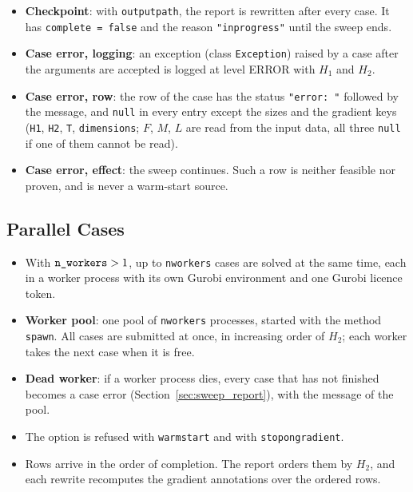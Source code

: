 \documentclass[11pt,a4paper]{article}
\theoremstyle{plain}
\theoremstyle{definition}
\renewcommand{\_}{\textunderscore\allowbreak{}}
\begin{document}
\begin{itemize}[nosep,leftmargin=1.5em]
  \item \textbf{Checkpoint}: with \texttt{output\_path}, the report is rewritten after every case. It has \texttt{complete = false} and the reason \texttt{"in\_progress"} until the sweep ends.
  \item \textbf{Case error, logging}: an exception (class \texttt{Exception}) raised by a case after the arguments are accepted is logged at level ERROR with $H_1$ and $H_2$.
  \item \textbf{Case error, row}: the row of the case has the status \texttt{"error: "} followed by the message, and \texttt{null} in every entry except the sizes and the gradient keys (\texttt{H1}, \texttt{H2}, \texttt{T}, \texttt{dimensions}; $F$, $M$, $L$ are read from the input data, all three \texttt{null} if one of them cannot be read).
  \item \textbf{Case error, effect}: the sweep continues. Such a row is neither feasible nor proven, and is never a warm-start source.
\end{itemize}

\subsection{Parallel Cases}
\label{sec:sweep_parallel}

\begin{itemize}[nosep,leftmargin=1.5em]
  \item With $\texttt{n\_workers} > 1$, up to \texttt{n\_workers} cases are solved at the same time, each in a worker process with its own Gurobi environment and one Gurobi licence token.
  \item \textbf{Worker pool}: one pool of \texttt{n\_workers} processes, started with the method \texttt{spawn}. All cases are submitted at once, in increasing order of $H_2$; each worker takes the next case when it is free.
  \item \textbf{Dead worker}: if a worker process dies, every case that has not finished becomes a case error (Section~\ref{sec:sweep_report}), with the message of the pool.
  \item The option is refused with \texttt{warm\_start} and with \texttt{stop\_on\_gradient}.
  \item Rows arrive in the order of completion. The report orders them by $H_2$, and each rewrite recomputes the gradient annotations over the ordered rows.
\end{itemize}
\end{document}
